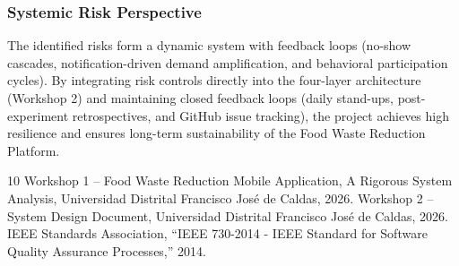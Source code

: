 \documentclass[9pt,conference]{IEEEtran}
\begin{document}
\subsubsection{Systemic Risk Perspective}
The identified risks form a dynamic system with feedback loops (no-show cascades, notification-driven demand amplification, and behavioral participation cycles). By integrating risk controls directly into the four-layer architecture (Workshop 2) and maintaining closed feedback loops (daily stand-ups, post-experiment retrospectives, and GitHub issue tracking), the project achieves high resilience and ensures long-term sustainability of the Food Waste Reduction Platform.


\begin{thebibliography}{10}
 Workshop 1 – Food Waste Reduction Mobile Application, A Rigorous System Analysis, Universidad Distrital Francisco José de Caldas, 2026.
 Workshop 2 – System Design Document, Universidad Distrital Francisco José de Caldas, 2026.
 IEEE Standards Association, ``IEEE 730-2014 - IEEE Standard for Software Quality Assurance Processes,'' 2014.
\end{thebibliography}
\end{document}
